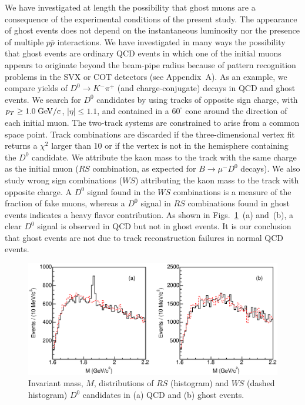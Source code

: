 \documentclass[aps,prd,preprint,floatfix,nofootinbib,superscriptaddress,showpacs,amssymb]{revtex4}
\def\deg{^\circ}
\begin{document}
 We have investigated at length the possibility that ghost muons
 are a consequence of the experimental conditions of the present study.
 The appearance of ghost events does not depend on the instantaneous
 luminosity nor  the presence of multiple $p\bar{p}$ interactions.
 We have investigated in many ways the possibility that ghost events
 are ordinary QCD events in which one of the initial muons appears to
 originate beyond the beam-pipe radius because of pattern recognition
 problems in the SVX or COT detectors (see Appendix~A). As an example,
 we compare yields of $D^0 \rightarrow K^-\pi^+$ (and charge-conjugate)
 decays in QCD and ghost events. We search for $D^0$ candidates by using
 tracks of opposite sign charge, with $p_T\geq 1.0\; {\rm GeV/}c$,
 $|\eta| \leq 1.1$, and contained in a  60$^{\deg}$ cone around the
 direction of each initial muon. The two-track systems are constrained
 to arise from a common space point. Track combinations are discarded if
 the three-dimensional vertex fit returns a $\chi^2$ larger than 10 or if
 the vertex is not in the hemisphere containing the $D^0$ candidate.
 We attribute the kaon mass to the track with the same charge as the initial
 muon ($RS$ combination, as expected for $B \rightarrow \mu^- D^0$ decays).
 We also study wrong sign combinations ($WS$) attributing the kaon mass to
 the track with opposite charge. A $D^0$ signal found in the $WS$ combinations
 is a measure of the fraction of fake muons, whereas a $D^0$ signal in 
 $RS$ combinations found in ghost events indicates a heavy flavor contribution.
 As shown in Figs.~\ref{fig:fig_40}~(a) and~(b), a clear $D^0$ signal is
 observed in QCD but not in ghost events. It is our conclusion that ghost
 events are not due to track reconstruction failures in normal QCD events.
 \begin{figure}
 \begin{center}
 \vspace{-0.3in}
 \leavevmode
 \includegraphics*[width=\textwidth]{fa0_42.eps}
 \caption[]{Invariant mass, $M$, distributions of $RS$ (histogram) and
            $WS$ (dashed histogram) $D^0$ candidates in (a) QCD and (b)
            ghost events.}
 \label{fig:fig_40}
 \end{center}
 \end{figure}
\end{document}
